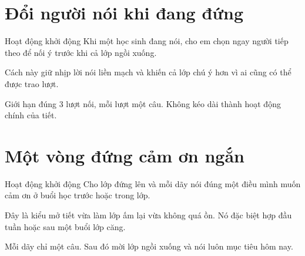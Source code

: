 \section{Đổi người nói khi đang đứng}
\begin{khoidongbox}{Hoạt động khởi động}
Khi một học sinh đang nói, cho em chọn ngay người tiếp theo để nối ý trước khi cả lớp ngồi xuống.
\end{khoidongbox}
\begin{visaohieuqua}
Cách này giữ nhịp lời nói liền mạch và khiến cả lớp chú ý hơn vì ai cũng có thể được trao lượt.
\end{visaohieuqua}
\begin{cachlam5phut}
Giới hạn đúng 3 lượt nối, mỗi lượt một câu. Không kéo dài thành hoạt động chính của tiết.
\end{cachlam5phut}
\ngancach

\section{Một vòng đứng cảm ơn ngắn}
\begin{khoidongbox}{Hoạt động khởi động}
Cho lớp đứng lên và mỗi dãy nói đúng một điều mình muốn cảm ơn ở buổi học trước hoặc trong lớp.
\end{khoidongbox}
\begin{visaohieuqua}
Đây là kiểu mở tiết vừa làm lớp ấm lại vừa không quá ồn. Nó đặc biệt hợp đầu tuần hoặc sau một buổi lớp căng.
\end{visaohieuqua}
\begin{cachlam5phut}
Mỗi dãy chỉ một câu. Sau đó mời lớp ngồi xuống và nói luôn mục tiêu hôm nay.
\end{cachlam5phut}